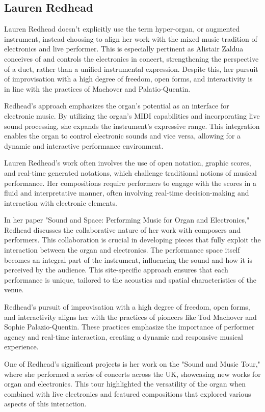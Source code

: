 \documentclass[12pt,twoside,maitrise]{dms_ks}
\theoremstyle{definition}
\begin{document}
\subsection{Lauren Redhead}

Lauren Redhead doesn't explicitly use the term hyper-organ, or augmented instrument, instead choosing to align her work with the mixed music tradition of electronics and live performer. This is especially pertinent as Alistair Zaldua conceives of and controls the electronics in concert, strengthening the perspective of a duet, rather than a unified instrumental expression. Despite this, her pursuit of improvisation with a high degree of freedom, open forms, and interactivity is in line with the practices of Machover and Palatio-Quentin.

Redhead's approach emphasizes the organ's potential as an interface for electronic music. By utilizing the organ’s MIDI capabilities and incorporating live sound processing, she expands the instrument’s expressive range. This integration enables the organ to control electronic sounds and vice versa, allowing for a dynamic and interactive performance environment.

Lauren Redhead’s work often involves the use of open notation, graphic scores, and real-time generated notations, which challenge traditional notions of musical performance. Her compositions require performers to engage with the scores in a fluid and interpretative manner, often involving real-time decision-making and interaction with electronic elements.

In her paper "Sound and Space: Performing Music for Organ and Electronics," Redhead discusses the collaborative nature of her work with composers and performers. This collaboration is crucial in developing pieces that fully exploit the interaction between the organ and electronics. The performance space itself becomes an integral part of the instrument, influencing the sound and how it is perceived by the audience. This site-specific approach ensures that each performance is unique, tailored to the acoustics and spatial characteristics of the venue.

Redhead’s pursuit of improvisation with a high degree of freedom, open forms, and interactivity aligns her with the practices of pioneers like Tod Machover and Sophie Palazio-Quentin. These practices emphasize the importance of performer agency and real-time interaction, creating a dynamic and responsive musical experience.

One of Redhead’s significant projects is her work on the "Sound and Music Tour," where she performed a series of concerts across the UK, showcasing new works for organ and electronics. This tour highlighted the versatility of the organ when combined with live electronics and featured compositions that explored various aspects of this interaction.
\end{document}
